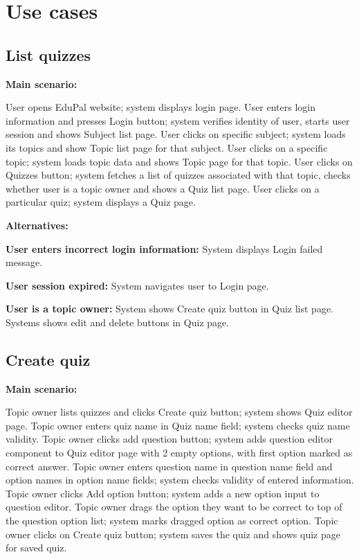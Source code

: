\documentclass[
    english, %
]{VUMIFPSkursinis}
\begin{document}
\section{Use cases}

\subsection{List quizzes}

\noindent\textbf{\fontsize{13}{15}\selectfont Main scenario:}

User opens EduPal website; system displays login page. User enters login information and presses Login button; system verifies identity of user, starts user session and shows Subject list page. User clicks on specific subject; system loads its topics and show Topic list page for that subject. User clicks on a specific topic; system loads topic data and shows Topic page for that topic. User clicks on Quizzes button; system fetches a list of quizzes associated with that topic, checks whether user is a topic owner and shows a Quiz list page. User clicks on a particular quiz; system displays a Quiz page.

\noindent\textbf{\fontsize{13}{15}\selectfont Alternatives:}

\textbf{User enters incorrect login information:} System displays Login failed message.

\textbf{User session expired:} System navigates user to Login page.

\textbf{User is a topic owner:} System shows Create quiz button in Quiz list page. Systems shows edit and delete buttons in Quiz page.

\subsection{Create quiz}

\noindent\textbf{\fontsize{13}{15}\selectfont Main scenario:}

Topic owner lists quizzes and clicks Create quiz button; system shows Quiz editor page. Topic owner enters quiz name in Quiz name field; system checks quiz name validity. Topic owner clicks add question button; system adds question editor component to Quiz editor page with 2 empty options, with first option marked as correct answer. Topic owner enters question name in question name field and option names in option name fields; system checks validity of entered information. Topic owner clicks Add option button; system adds a new option input to question editor. Topic owner drags the option they want to be correct to top of the question option list; system marks dragged option as correct option. Topic owner clicks on Create quiz button; system saves the quiz and shows quiz page for saved quiz.
\end{document}
